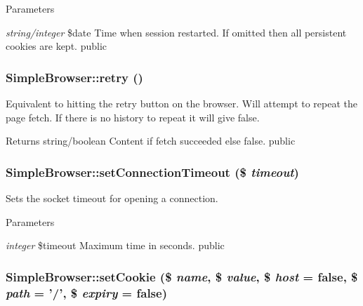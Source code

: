 \begin{DoxyParams}{Parameters}
\item[{\em string/integer}]\$date Time when session restarted. If omitted then all persistent cookies are kept.  public \end{DoxyParams}
\hypertarget{class_simple_browser_a0d32478aff0c58024a9eca0ba2747555}{
\subsubsection[{retry}]{\setlength{\rightskip}{0pt plus 5cm}SimpleBrowser::retry ()}}
\label{class_simple_browser_a0d32478aff0c58024a9eca0ba2747555}
Equivalent to hitting the retry button on the browser. Will attempt to repeat the page fetch. If there is no history to repeat it will give false. \begin{DoxyReturn}{Returns}
string/boolean Content if fetch succeeded else false.  public 
\end{DoxyReturn}
\hypertarget{class_simple_browser_a689fac1e736776ccd1d3e0e0834ef048}{
\subsubsection[{setConnectionTimeout}]{\setlength{\rightskip}{0pt plus 5cm}SimpleBrowser::setConnectionTimeout (\$ {\em timeout})}}
\label{class_simple_browser_a689fac1e736776ccd1d3e0e0834ef048}
Sets the socket timeout for opening a connection. 
\begin{DoxyParams}{Parameters}
\item[{\em integer}]\$timeout Maximum time in seconds.  public \end{DoxyParams}
\hypertarget{class_simple_browser_a8f451a9d2285cde6ec22e976ce0655db}{
\subsubsection[{setCookie}]{\setlength{\rightskip}{0pt plus 5cm}SimpleBrowser::setCookie (\$ {\em name}, \/  \$ {\em value}, \/  \$ {\em host} = {\ttfamily false}, \/  \$ {\em path} = {\ttfamily '/'}, \/  \$ {\em expiry} = {\ttfamily false})}}
\label{class_simple_browser_a8f451a9d2285cde6ec22e976ce0655db}

